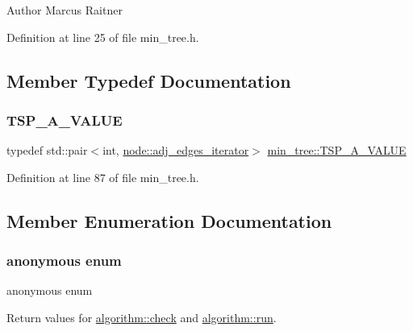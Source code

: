\begin{DoxyAuthor}{Author}
Marcus Raitner 
\end{DoxyAuthor}


Definition at line 25 of file min\+\_\+tree.\+h.



\subsection{Member Typedef Documentation}
\mbox{\label{classmin__tree_af83e196caf3ebcdc9035dc42aee581ee}} 
\subsubsection{\texorpdfstring{T\+S\+P\+\_\+\+A\+\_\+\+V\+A\+L\+UE}{TSP\_A\_VALUE}}
{\footnotesize\ttfamily typedef std\+::pair$<$int, \mbox{\hyperlink{classnode_abdd49248203010f2d5432dfef22d017a}{node\+::adj\+\_\+edges\+\_\+iterator}}$>$ \mbox{\hyperlink{classmin__tree_af83e196caf3ebcdc9035dc42aee581ee}{min\+\_\+tree\+::\+T\+S\+P\+\_\+\+A\+\_\+\+V\+A\+L\+UE}}\hspace{0.3cm}{\ttfamily [private]}}



Definition at line 87 of file min\+\_\+tree.\+h.



\subsection{Member Enumeration Documentation}
\mbox{\label{classalgorithm_af1a0078e153aa99c24f9bdf0d97f6710}} 
\subsubsection{\texorpdfstring{anonymous enum}{anonymous enum}}
{\footnotesize\ttfamily anonymous enum\hspace{0.3cm}{\ttfamily [inherited]}}



Return values for \mbox{\hyperlink{classalgorithm_a76361fb03ad1cf643affc51821e43bed}{algorithm\+::check}} and \mbox{\hyperlink{classalgorithm_a734b189509a8d6b56b65f8ff772d43ca}{algorithm\+::run}}. 

